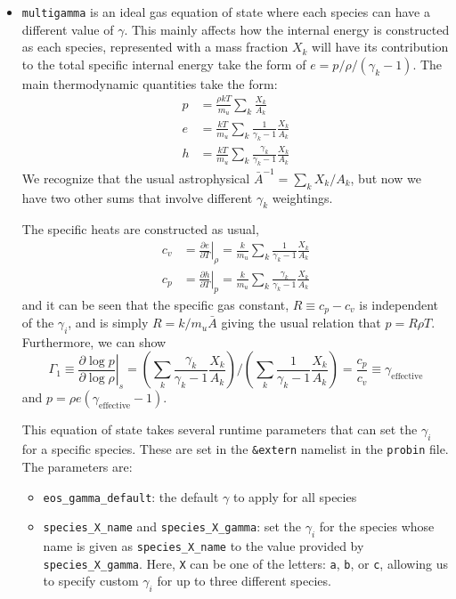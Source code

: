 \begin{itemize}
\item {\tt multigamma} is an ideal gas equation of state where each
  species can have a different value of $\gamma$.  This mainly affects
  how the internal energy is constructed as each species, represented
  with a mass fraction $X_k$ will have its contribution to the total
  specific internal energy take the form of $e = p/\rho/(\gamma_k -
  1)$.  The main thermodynamic quantities take the form:
\begin{align}
p &= \frac{\rho k T}{m_u} \sum_k \frac{X_k}{A_k} \\
e &= \frac{k T}{m_u} \sum_k \frac{1}{\gamma_k - 1} \frac{X_k}{A_k} \\
h &= \frac{k T}{m_u} \sum_k \frac{\gamma_k}{\gamma_k - 1} \frac{X_k}{A_k}
\end{align}
We recognize that the usual astrophysical $\bar{A}^{-1} = \sum_k
X_k/A_k$, but now we have two other sums that involve different
$\gamma_k$ weightings.

The specific heats are constructed as usual, 
\begin{align}
c_v &= \left . \frac{\partial e}{\partial T} \right |_\rho = 
    \frac{k}{m_u} \sum_k \frac{1}{\gamma_k - 1} \frac{X_k}{A_k} \\
c_p &= \left . \frac{\partial h}{\partial T} \right |_p = 
    \frac{k}{m_u} \sum_k \frac{\gamma_k}{\gamma_k - 1} \frac{X_k}{A_k} 
\end{align}
and it can be seen that the specific gas constant, $R \equiv c_p - c_v$ is
independent of the $\gamma_i$, and is simply $R = k/m_u\bar{A}$ giving the
usual relation that $p = R\rho T$.  Furthermore, we can show
\begin{equation}
\Gamma_1 \equiv \left . \frac{\partial \log p}{\partial \log \rho} \right |_s =  
   \left ( \sum_k \frac{\gamma_k}{\gamma_k - 1} \frac{X_k}{A_k} \right ) \bigg /
   \left ( \sum_k \frac{1}{\gamma_k - 1} \frac{X_k}{A_k} \right ) =
\frac{c_p}{c_v} \equiv \gamma_\mathrm{effective} 
\end{equation}
and $p = \rho e (\gamma_\mathrm{effective} - 1)$.

This equation of state takes several runtime parameters that can set the
$\gamma_i$ for a specific species.  These are set in the {\tt \&extern}
namelist in the {\tt probin} file.  The parameters are:
\begin{itemize}
\item {\tt eos\_gamma\_default}: the default $\gamma$ to apply for
  all species
\item {\tt species\_X\_name} and {\tt species\_X\_gamma}: set the $\gamma_i$
  for the species whose name is given as {\tt species\_X\_name} to the
  value provided by {\tt species\_X\_gamma}.  Here, {\tt X} can be one
  of the letters: {\tt a}, {\tt b}, or {\tt c}, allowing us to specify
  custom $\gamma_i$ for up to three different species.
\end{itemize}


\end{itemize}
